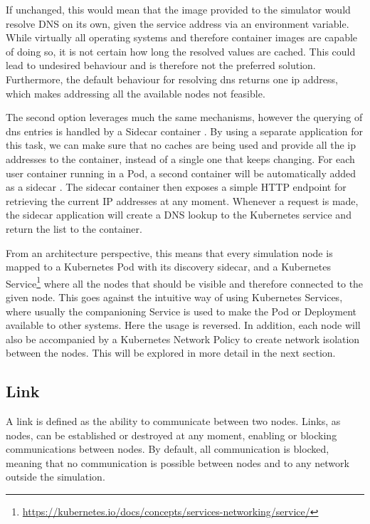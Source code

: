 If unchanged, this would mean that the image provided to the simulator would resolve DNS on its own, given the service address via an environment variable. While virtually all operating systems and therefore container images are capable of doing so, it is not certain how long the resolved values are cached. This could lead to undesired behaviour and is therefore not the preferred solution. Furthermore, the default behaviour for resolving \ac{dns} returns one \ac{ip} address, which makes addressing all the available nodes not feasible.

The second option leverages much the same mechanisms, however the querying of \ac{dns} entries is handled by a Sidecar container \cite{azure-sidecar}.
By using a separate application for this task, we can make sure that no caches are being used and provide all the \ac{ip} addresses to the container, instead of a single one that keeps changing.
For each user container running in a Pod, a second container will be automatically added as a sidecar \cite{azure-sidecar}. The sidecar container then exposes a simple HTTP endpoint for retrieving the current IP addresses at any moment.
Whenever a request is made, the sidecar application will create a DNS lookup to the Kubernetes service and return the list to the container.

From an architecture perspective, this means that every simulation node is mapped to a Kubernetes Pod with its discovery sidecar, and a Kubernetes Service\footnote{\url{https://kubernetes.io/docs/concepts/services-networking/service/}} where all the nodes that should be visible and therefore connected to the given node.
This goes against the intuitive way of using Kubernetes Services, where usually the companioning Service is used to make the Pod or Deployment available to other systems. Here the usage is reversed. In addition, each node will also be accompanied by a Kubernetes Network Policy to create network isolation between the nodes. This will be explored in more detail in the next section.

\subsection{Link \label{sim-link}}

A link is defined as the ability to communicate between two nodes.
Links, as nodes, can be established or destroyed at any moment, enabling or blocking communications between nodes.
By default, all communication is blocked, meaning that no communication is possible between nodes and to any network outside the simulation.

